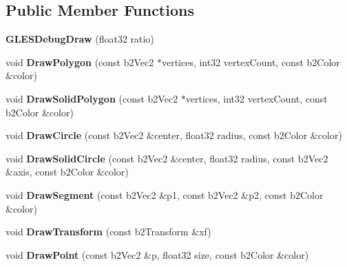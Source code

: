 \subsection*{Public Member Functions}
\begin{DoxyCompactItemize}
\item 
\hypertarget{class_g_l_e_s_debug_draw_a658e964ffb386b8b67fb5a3bc5db27a3}{{\bfseries G\-L\-E\-S\-Debug\-Draw} (float32 ratio)}\label{d7/da9/class_g_l_e_s_debug_draw_a658e964ffb386b8b67fb5a3bc5db27a3}

\item 
\hypertarget{class_g_l_e_s_debug_draw_afab4f8ea8882119f62134f9667e9e2da}{void {\bfseries Draw\-Polygon} (const b2\-Vec2 $\ast$vertices, int32 vertex\-Count, const b2\-Color \&color)}\label{d7/da9/class_g_l_e_s_debug_draw_afab4f8ea8882119f62134f9667e9e2da}

\item 
\hypertarget{class_g_l_e_s_debug_draw_aa68490f03cf0cb567ce6ccd78b18c5c3}{void {\bfseries Draw\-Solid\-Polygon} (const b2\-Vec2 $\ast$vertices, int32 vertex\-Count, const b2\-Color \&color)}\label{d7/da9/class_g_l_e_s_debug_draw_aa68490f03cf0cb567ce6ccd78b18c5c3}

\item 
\hypertarget{class_g_l_e_s_debug_draw_a9beacb1f221106e10ea68614ff336bf8}{void {\bfseries Draw\-Circle} (const b2\-Vec2 \&center, float32 radius, const b2\-Color \&color)}\label{d7/da9/class_g_l_e_s_debug_draw_a9beacb1f221106e10ea68614ff336bf8}

\item 
\hypertarget{class_g_l_e_s_debug_draw_ac06ea317fe6075cb9e1ff87ff89b8007}{void {\bfseries Draw\-Solid\-Circle} (const b2\-Vec2 \&center, float32 radius, const b2\-Vec2 \&axis, const b2\-Color \&color)}\label{d7/da9/class_g_l_e_s_debug_draw_ac06ea317fe6075cb9e1ff87ff89b8007}

\item 
\hypertarget{class_g_l_e_s_debug_draw_a2a24d1fe4eb99b6382380c234ab77382}{void {\bfseries Draw\-Segment} (const b2\-Vec2 \&p1, const b2\-Vec2 \&p2, const b2\-Color \&color)}\label{d7/da9/class_g_l_e_s_debug_draw_a2a24d1fe4eb99b6382380c234ab77382}

\item 
\hypertarget{class_g_l_e_s_debug_draw_a2306fb12b6f6e69d84fcb79bcddfcfbf}{void {\bfseries Draw\-Transform} (const b2\-Transform \&xf)}\label{d7/da9/class_g_l_e_s_debug_draw_a2306fb12b6f6e69d84fcb79bcddfcfbf}

\item 
\hypertarget{class_g_l_e_s_debug_draw_a84ce73b36e8b9e2843b2deacebeee839}{void {\bfseries Draw\-Point} (const b2\-Vec2 \&p, float32 size, const b2\-Color \&color)}\label{d7/da9/class_g_l_e_s_debug_draw_a84ce73b36e8b9e2843b2deacebeee839}


\end{DoxyCompactItemize}
